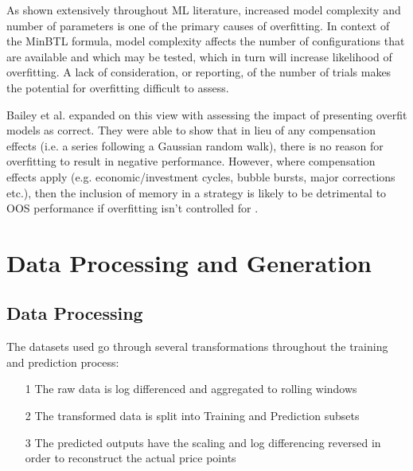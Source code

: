 \documentclass[a4paper,11pt,oneside]{article}
\theoremstyle{plain}
\theoremstyle{definition}
\begin{document}
	As shown extensively throughout ML literature, increased model complexity and number of parameters is one of 
	the primary causes of overfitting. In context of the MinBTL formula, model complexity affects the number of 
	configurations that are available and which may be tested, which in turn will increase likelihood of overfitting. 
	A lack of consideration, or reporting, of the number of trials makes the potential for overfitting difficult to assess. 
	\hfill \break 
	
	Bailey et al. expanded on this view with assessing the impact of presenting overfit models as correct. 
	They were able to show that in lieu of any compensation effects (i.e. a series following a Gaussian random walk), 
	there is no reason for overfitting to result in negative performance. However, where compensation effects apply 
	(e.g. economic/investment cycles, bubble bursts, major corrections etc.), then the inclusion of memory in a strategy
	is likely to be detrimental to OOS performance if overfitting isn’t controlled for \cite{BaileyBTL}.
	\hfill \break 
	
	\newpage
	
	\section{Data Processing and Generation }\label{Data}
	\subsection{Data Processing}\label{data_processing}
	
	The datasets used go through several transformations throughout the training and prediction process:
	
	\begin{itemize}
		\item [1] The raw data is log differenced and aggregated to rolling windows
		\item [2] The transformed data is split into Training and Prediction subsets
		\item [3] The predicted outputs have the scaling and log differencing reversed in order to reconstruct the actual price points
	\end{itemize}
	
\end{document}
